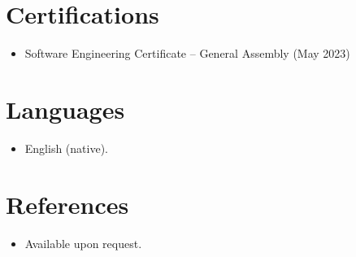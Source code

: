 \documentclass[11pt,a4paper,sans]{moderncv}
\begin{document}
\section{Certifications}
\vspace{1pt}
\begin{itemize}
\item{Software Engineering Certificate -- General Assembly (May 2023)}
\end{itemize}


\section{Languages}
\vspace{1pt}
\begin{itemize}
\item English (native).
\end{itemize}


\section{References}
\vspace{1pt}
\begin{itemize}
\item{Available upon request.}
\end{itemize}
\end{document}
